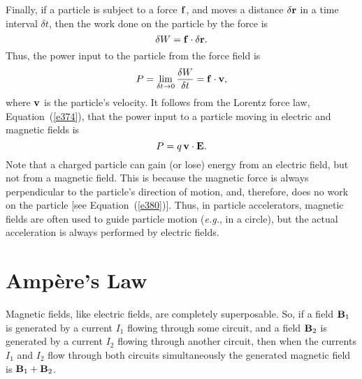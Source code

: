 Finally, if a particle is subject to a force ${\bf f}$, and moves a distance 
$\delta
{\bf r}$ in a time interval $\delta t$, then the work done on the particle by the
force is
\begin{equation}\label{e380}
\delta W = {\bf f}\cdot \delta {\bf r}.
\end{equation}
Thus, the power input  to the particle from the force field is
\begin{equation}
P = \lim_{\delta t\rightarrow 0} \frac{\delta W}{\delta t} = {\bf f}\cdot
 {\bf v},
\end{equation}
where ${\bf v}$ is the particle's velocity. It follows from the Lorentz force
law, Equation~(\ref{e374}), that the power input to a particle moving in electric and magnetic
fields is
\begin{equation}
P = q\,{\bf v}\cdot {\bf E}.
\end{equation}
Note that a charged particle can gain (or lose) energy from an electric
field, but not from a magnetic field. This is because the magnetic force is
always perpendicular to the particle's direction of motion, and, therefore, does
no work on the particle [see Equation~(\ref{e380})]. Thus, in particle accelerators, magnetic
fields are often used to guide particle motion ({\em e.g.}, in a circle), but the
actual acceleration is always performed by electric fields.

\section{Amp\`{e}re's Law}
Magnetic fields, like electric fields, are completely superposable. So, if
a field ${\bf B}_1$ is generated by a current $I_1$ flowing through some circuit,
and a field ${\bf B}_2$ is generated by a current $I_2$ flowing through another
 circuit, then when the currents $I_1$ and $I_2$ flow through both circuits
simultaneously the generated magnetic field is ${\bf B}_1+{\bf B}_2$.

